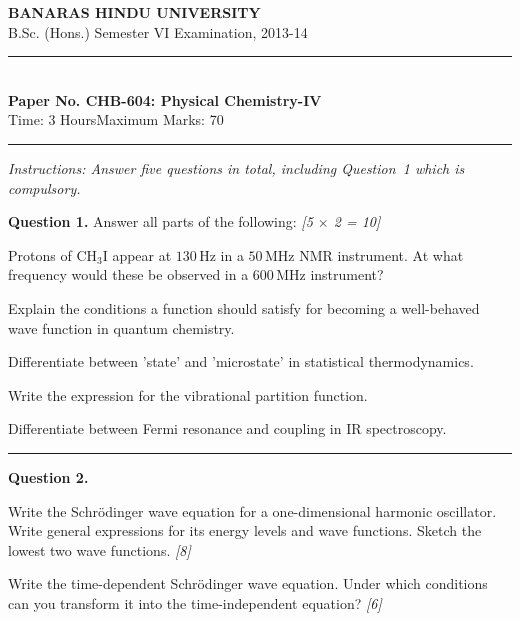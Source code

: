 \documentclass[11pt,a4paper]{article}
\newcommand{\pts}[1]{\hfill   \textit{[#1]}}
\begin{document}
\begin{center}
  {\large\bfseries BANARAS HINDU UNIVERSITY}\\[2pt]
  {\normalsize B.Sc. (Hons.) Semester VI Examination, 2013-14}\\[6pt]
  \rule{0.8\linewidth}{0.5pt}\\[6pt]
  {\large\bfseries Paper No. CHB-604: Physical Chemistry-IV}\\[4pt]
  {\normalsize Time: 3 Hours\hfill Maximum Marks: 70}
\end{center}
\rule{\linewidth}{0.4pt}
\small



\noindent   \textit{Instructions: Answer five questions in total, including Question~1 which is compulsory.}

\normalsize
\bigskip




\noindent   \textbf{Question 1.} Answer all parts of the following: \pts{5 $ \times$ 2 = 10}

\begin{parts}
  \item Protons of $ \text{CH}_3 \text{I}$ appear at $130\, \text{Hz}$ in a $50\, \text{MHz}$ NMR instrument. At what frequency would these be observed in a $600\, \text{MHz}$ instrument?
  \item Explain the conditions a function should satisfy for becoming a well-behaved wave function in quantum chemistry.
  \item Differentiate between 'state' and 'microstate' in statistical thermodynamics.
  \item Write the expression for the vibrational partition function.
  \item Differentiate between Fermi resonance and coupling in IR spectroscopy.
\end{parts}

\medskip\rule{\linewidth}{0.2pt}




\noindent   \textbf{Question 2.}

\begin{parts}
  \item Write the Schr\"odinger wave equation for a one-dimensional harmonic oscillator. Write general expressions for its energy levels and wave functions. Sketch the lowest two wave functions. \pts{8}
  \item Write the time-dependent Schr\"odinger wave equation. Under which conditions can you transform it into the time-independent equation? \pts{6}
\end{parts}
\end{document}
